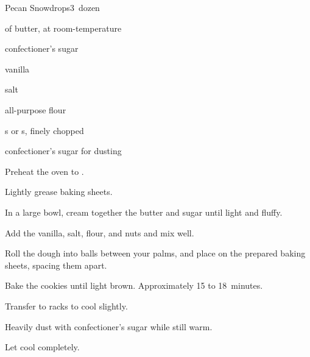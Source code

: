 \begin{recipe}{Pecan Snowdrops}{}{3~dozen}

\begin{ingredients}
\item \C{\threequarter} of butter, at room-temperature
\item \C{\third} confectioner's sugar
\item {} vanilla
\item \tp{\eighth} salt
\item \C{1 \half} all-purpose flour
\item \C{\threequarter} s or s, finely chopped
\item confectioner's sugar for dusting
\end{ingredients}

\begin{directions}
\item Preheat the oven to .
\item Lightly grease baking sheets.
\item In a large bowl, cream together the butter and sugar until light and fluffy.
\item Add the vanilla, salt, flour, and nuts and mix well.
\item Roll the dough into \inch{\threequarter} balls between your palms, and place on the prepared baking sheets, spacing them \inch{1 \half} apart.
\item Bake the cookies until light brown. Approximately 15 to 18~minutes.
\item Transfer to racks to cool slightly.
\item Heavily dust with confectioner's sugar while still warm.
\item Let cool completely.
\end{directions}

\end{recipe}
